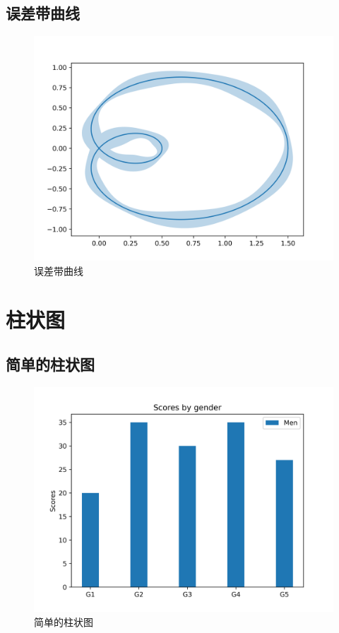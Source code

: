 \documentclass[openany]{progbookcn}
\begin{document}
\subsection{误差带曲线}

\begin{figure}[H]
\centering
\includegraphics[width=0.6 \textwidth]{figs/chapter24/lines/ErrorBandCurve}
\caption{误差带曲线}
\end{figure}



\section{柱状图}
\subsection{简单的柱状图}

\begin{figure}[H]
\centering
\includegraphics[width=0.6 \textwidth]{figs/chapter24/bars/SimpleBar}
\caption{简单的柱状图}
\end{figure}
\end{document}
